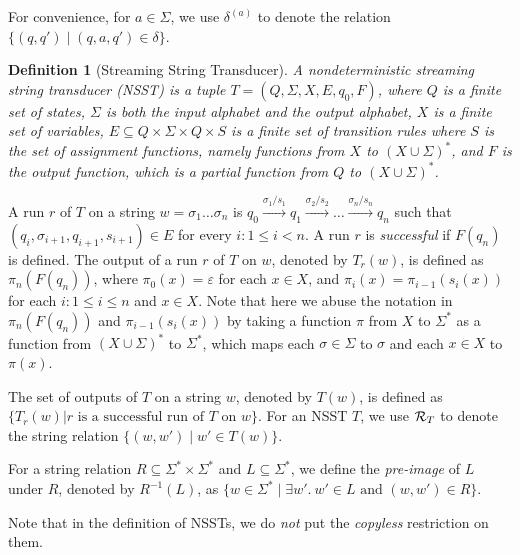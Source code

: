 \documentclass[sigplan,review,anonymous]{acmart}\settopmatter{printfolios=true,printccs=false,printacmref=false}
\newcommand{\tmop}[1]{\ensuremath{\operatorname{#1}}}
\newtheorem{definition}{Definition}
\newcommand\NSST{{\sf NSST}}
\begin{document}
For convenience, for $a \in \Sigma$, we use $\delta^{(a)}$ to denote the  relation $\{(q, q') \mid (q, a, q') \in \delta\}$.


\begin{definition}[Streaming String Transducer]
  A nondeterministic streaming string transducer (\NSST) is a tuple $T = (Q, \Sigma, X, E, q_0, F)$, where $Q$ is a finite set of states, $\Sigma$ is both the input alphabet and the output alphabet, $X$ is a finite set of variables, $E \subseteq Q \times \Sigma \times Q \times S$ is a finite set of
  transition rules where $S$ is the set of assignment functions, namely functions from $X$ to $(X
  \cup \Sigma)^{\ast}$, and $F$ is the output function, which is a partial function from $Q$ to $(X \cup
  \Sigma)^{\ast}$.
  \end{definition}
  
  A run $r$ of $T$ on a string $w = \sigma_1 \ldots \sigma_n$ is $q_0 \xrightarrow{\sigma_1 / s_1} q_1
  \xrightarrow{\sigma_2 / s_2} \ldots \xrightarrow{\sigma_n / s_n} q_n$ such that
  $(q_i, \sigma_{i + 1}, q_{i + 1}, s_{i + 1}) \in E$ for every $i: 1 \le i < n$. A run $r$ is \emph{successful} if $F(q_n)$ is
  defined. The output of a run $r$ of $T$ on $w$, denoted by $T_r(w)$, is defined as $\pi_n(F(q_n))$, where $\pi_0(x) = \varepsilon$ for each $x \in X$, and $\pi_{i}(x) = \pi_{i-1}(s_{i}(x))$ for each $i: 1 \le i \le n$ and $x \in X$. Note that here we abuse the notation in $\pi_n(F(q_n))$ and $\pi_{i-1}(s_{i}(x))$ by taking a function $\pi$ from $X$ to $\Sigma^*$ as a function from $(X \cup \Sigma)^*$ to $\Sigma^*$, which maps each $\sigma \in \Sigma$ to $\sigma$ and each $x \in X$ to $\pi(x)$.  
  
  
The set of outputs of $T$ on a string $w$, denoted by $T(w)$, is defined as $\{ T_r(w) | r
\mbox{ is a successful run of } T \mbox{ on } w \}$. For an \NSST{} $T$, we use $\mathcal{R}_T$ to denote the string relation $\{(w, w') \mid w' \in T(w)\}$.

For a string relation $R \subseteq \Sigma^* \times \Sigma^*$ and $L \subseteq \Sigma^*$, we define the \emph{pre-image} of $L$ under $R$, denoted by $R^{-1}(L)$, as $\{w \in \Sigma^* \mid \exists w'.\ w' \in L \mbox{ and } (w, w') \in R\}$. 

Note that in the definition of \NSST{}s, we do \emph{not} put the  \emph{copyless} restriction on them.
\end{document}
